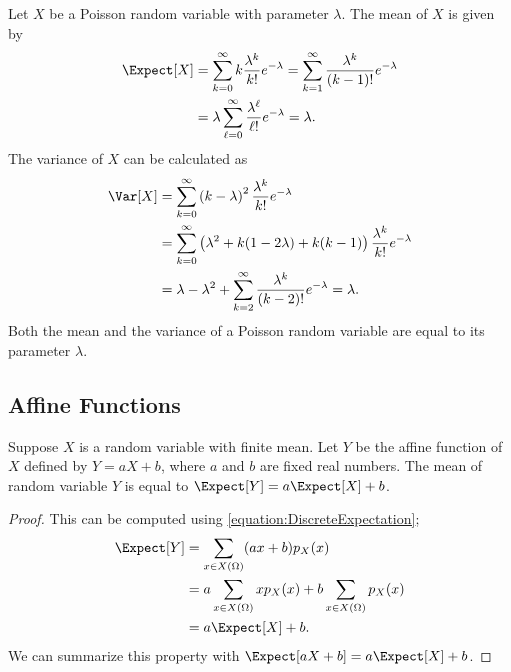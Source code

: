 \begin{example} \label{example:PoissonMeanVariance}
Let $X$ be a Poisson random variable with parameter $\lambda$.
The mean of $X$ is given by
\begin{equation*}
\begin{split}
\Expect [X] &= \sum_{k=0}^{\infty} k \frac{\lambda^k}{k!} e^{- \lambda}
= \sum_{k=1}^{\infty} \frac{\lambda^k}{(k-1)!} e^{- \lambda} \\
&= \lambda \sum_{\ell=0}^{\infty} \frac{\lambda^\ell}{\ell!} e^{- \lambda}
= \lambda .
\end{split}
\end{equation*}
The variance of $X$ can be calculated as
\begin{equation*}
\begin{split}
\Var [X] &= \sum_{k=0}^{\infty} \left( k - \lambda \right)^2
\frac{\lambda^k}{k!} e^{- \lambda} \\
&= \sum_{k=0}^{\infty} \left(\lambda^2 + k (1 - 2 \lambda) + k(k-1) \right)
\frac{\lambda^k}{k!} e^{- \lambda} \\
&= \lambda - \lambda^2
+ \sum_{k=2}^{\infty} \frac{\lambda^k}{(k-2)!} e^{- \lambda}
= \lambda .
\end{split}
\end{equation*}
Both the mean and the variance of a Poisson random variable are equal to its parameter $\lambda$.
\end{example}


\subsection{Affine Functions}

\begin{proposition}
Suppose $X$ is a random variable with finite mean.
Let $Y$ be the affine function of $X$ defined by $Y = aX + b$, where $a$ and $b$ are fixed real numbers.
The mean of random variable $Y$ is equal to $\Expect [Y] = a \Expect [X] + b$.
\end{proposition}
\begin{proof}
This can be computed using \eqref{equation:DiscreteExpectation};
\begin{equation*}
\begin{split}
\Expect [Y] &= \sum_{x \in X(\Omega)} (ax + b) p_X(x) \\
&= a \sum_{x \in X(\Omega)} x p_X(x) + b \sum_{x \in X(\Omega)} p_X(x) \\
&= a \Expect [X] + b.
\end{split}
\end{equation*}
We can summarize this property with $\Expect [a X + b] = a \Expect [X] + b$.
\end{proof}

